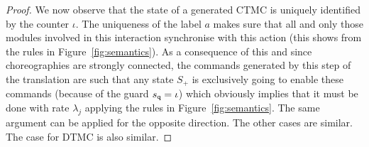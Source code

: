 \begin{proof}
  We now observe that the state of a generated CTMC is uniquely
  identified by the counter $\iota$.  The uniqueness of the label $a$
  makes sure that all and only those modules involved in this
  interaction synchronise with this action (this shows from the rules
  in Figure~\ref{fig:semantics}).  As a consequence of this and since
  choreographies are strongly connected, the commands generated by
  this step of the translation are such that any state $S_+$ is
  exclusively going to enable these commands (because of the guard
  $s_{\mathtt{q}}=\iota$) which obviously implies that it must be done
  with rate $\lambda_j$ applying the rules in
  Figure~\ref{fig:semantics}. The same argument can be applied for the
  opposite direction.
  The other cases are similar. The case for DTMC is also similar.







\end{proof}
